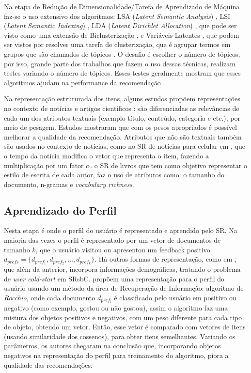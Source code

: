 \documentclass[
    12pt,                %
    oneside,            %
    a4paper,            %
    english,            %
    brazil                %
    ]{abntex2ppgsi}
\begin{document}
Na etapa de Redução de Dimensionalidade/Tarefa de Aprendizado de Máquina faz-se o uso extensivo dos algoritmos: LSA (\textit{Latent Semantic Analysis}) \cite{Taraghi2013, Domingues2012, Spaeth2013}, LSI (\textit{Latent Semantic Indexing}) \cite{Saaya2013}, LDA (\textit{Latent Dirichlet Allocation}) \cite{Tantanasiriwong2012, Qu2012, Wang2012, Vaz2012}, que pode ser visto como uma extensão de Biclusterização \cite{Skillicorn2012}, e Variáveis Latentes \cite{Cleger2012}, que podem ser vistos por resolver uma tarefa de clusterização, que é agrupar termos em grupos que são chamados de tópicos \cite{Wang2012}.
O desafio é escolher o número de tópicos, por isso, grande parte dos trabalhos que fazem o uso dessas técnicas, realizam testes variando o número de tópicos.
Esses testes geralmente mostram que esses algoritmos ajudam na performance da recomendação \cite{Cleger2012, Tantanasiriwong2012, Saaya2013, Spaeth2013,Vaz2012}.

Na representação estruturada dos itens, alguns estudos propõem representações no contexto de notícias e artigos científicos \cite{Bielikova2012, Lops2013}: são diferenciadas as relevâncias de cada um dos atributos textuais (exemplo título, conteúdo, categoria e etc.), por meio de pesagem.
Estudos mostraram que com os pesos apropriados é possível melhorar a qualidade da recomendação.
Atributos que não são textuais também são usados no contexto de notícias, como no SR de notícias para celular em \cite{Yeung2012}, que o tempo da notícia modifica o vetor que representa o item, fazendo a multiplicação por um fator $\alpha$. o SR de livros \cite{Vaz2012} que tem como objetivo representar o estilo de escrita de cada autor, faz o uso de atributos como: o tamanho do documento, n-gramas e \textit{vocabulary richness}.

\subsection{Aprendizado do Perfil}
\label{subsec:perfil}

Nesta etapa é onde o perfil do usuário é representado e aprendido pelo SR. Na maioria das vezes o perfil é representado por um vetor de documentos de tamanho $k$, que o usuário visitou ou apresentou um feedback positivo $d_{prefs} = \{d_{pref_1}, d_{pref_2}, \dots, d_{pref_k}\}$.
Há outras formas de representação, como em , que além da anterior, incorpora informações demográficas, tratando o problema de \textit{user cold-start} em SRsbC.
 propõem uma representação para o perfil do usuário usando um método da área de Recuperação de Informação: algoritmo de \textit{Rocchio}, onde cada documento $d_{pref_i}$ é classificado pelo usuário em positivo ou negativo (como exemplo, gostou ou não gostou), assim o algoritmo faz uma mistura dos objetos positivos e negativos, com um peso diferente para cada tipo de objeto, obtendo um vetor.
Então, esse vetor é comparado com vetores de itens (usando similaridade dos cossenos), para obter itens semelhantes.
Variando os parâmetros, os autores chegaram na conclusão que, incorporando objetos negativos na representação do perfil para treinamento do algoritmo, piora a qualidade das recomendações.
\end{document}

